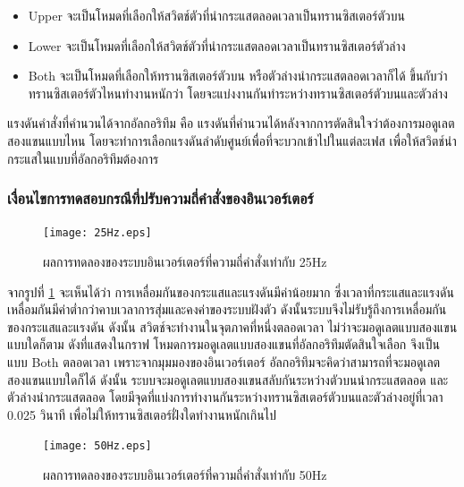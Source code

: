 \documentclass[11pt,a4paper]{article}
\begin{document}
\begin{itemize}
    \item Upper จะเป็นโหมดที่เลือกให้สวิตช์ตัวที่นำกระแสตลอดเวลาเป็นทรานซิสเตอร์ตัวบน
    \item Lower จะเป็นโหมดที่เลือกให้สวิตช์ตัวที่นำกระแสตลอดเวลาเป็นทรานซิสเตอร์ตัวล่าง
    \item Both จะเป็นโหมดที่เลือกให้ทรานซิสเตอร์ตัวบน หรือตัวล่างนำกระแสตลอดเวลาก็ได้ ขึ้นกับว่าทรานซิสเตอร์ตัวไหนทำงานหนักว่า โดยจะแบ่งงานกันทำระหว่างทรานซิสเตอร์ตัวบนและตัวล่าง
\end{itemize}

แรงดันคำสั่งที่คำนวนได้จากอัลกอริทึม คือ แรงดันที่คำนวนได้หลังจากการตัดสินใจว่าต้องการมอดูเลตสองแขนแบบไหน โดยจะทำการเลือกแรงดันลำดับศูนย์เพื่อที่จะบวกเข้าไปในแต่ละเฟส เพื่อให้สวิตช์นำกระแสในแบบที่อัลกอริทึมต้องการ

\subsubsection{เงื่อนไขการทดสอบกรณีที่ปรับความถี่คำสั่งของอินเวอร์เตอร์}

\begin{figure}[H]
    \centering
    \texttt{[image: 25Hz.eps]}
    \caption{ผลการทดลองของระบบอินเวอร์เตอร์ที่ความถี่คำสั่งเท่ากับ 25Hz}
    \label{25Hz}
\end{figure}

จากรูปที่ \ref{25Hz} จะเห็นได้ว่า การเหลื่อมกันของกระแสและแรงดันมีค่าน้อยมาก ซี่งเวลาที่กระแสและแรงดันเหลื่อมกันมีค่าต่ำกว่าคาบเวลาการสุ่มและคงค่าของระบบฝังตัว ดังนั้นระบบจึงไม่รับรู้ถึงการเหลื่อมกันของกระแสและแรงดัน ดังนั้น สวิตช์จะทำงานในจุตภาคที่หนึ่งตลอดเวลา ไม่ว่าจะมอดูเลตแบบสองแขนแบบใดก็ตาม ดังที่แสดงในกราฟ โหมดการมอดูเลตแบบสองแขนที่อัลกอริทึมตัดสินใจเลือก จึงเป็นแบบ Both ตลอดเวลา เพราะจากมุมมองของอินเวอร์เตอร์ อัลกอริทึมจะคิดว่าสามารถที่จะมอดูเลตสองแขนแบบใดก็ได้ ดังนั้น ระบบจะมอดูเลตแบบสองแขนสลับกันระหว่างตัวบนนำกระแสตลอด และตัวล่างนำกระแสตลอด โดยมีจุดที่แบ่งการทำงานกันระหว่างทรานซิสเตอร์ตัวบนและตัวล่างอยู่ที่เวลา 0.025 วินาที เพื่อไม่ให้ทรานซิสเตอร์ฝั่งใดทำงานหนักเกินไป

\begin{figure}[H]
    \centering
    \texttt{[image: 50Hz.eps]}
    \caption{ผลการทดลองของระบบอินเวอร์เตอร์ที่ความถี่คำสั่งเท่ากับ 50Hz}
    \label{50Hz}
\end{figure}
\end{document}
